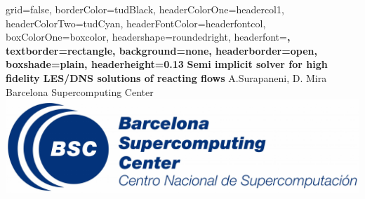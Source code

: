 \documentclass[a0paper,portrait]{baposter}
\begin{document}
	
	
	\begin{poster}{
			grid=false,
			borderColor=tudBlack, %
			headerColorOne=headercol1, %
			headerColorTwo=tudCyan, %
			headerFontColor=headerfontcol, %
			boxColorOne=boxcolor, %
			headershape=roundedright, %
			headerfont=\Large\sf\bf, %
			textborder=rectangle,
			background=none,
			headerborder=open, %
			boxshade=plain,
			headerheight=0.13\textheight
		}
		{}
		{\sf\bf\smaller Semi implicit solver for high fidelity LES/DNS solutions of reacting flows} %
		{\vspace{0.5em} A.Surapaneni, D. Mira \\
			\vspace{1mm}{\footnotesize(anurag.surapaneni@bsc.es)\\} 
			\vspace{2mm}Barcelona Supercomputing Center} %
		{\includegraphics[scale=0.3]{Logos/BSC_logo_280.jpeg}} %
		
		
		
		{
        
        \smaller
        
}
\end{poster}
\end{document}

